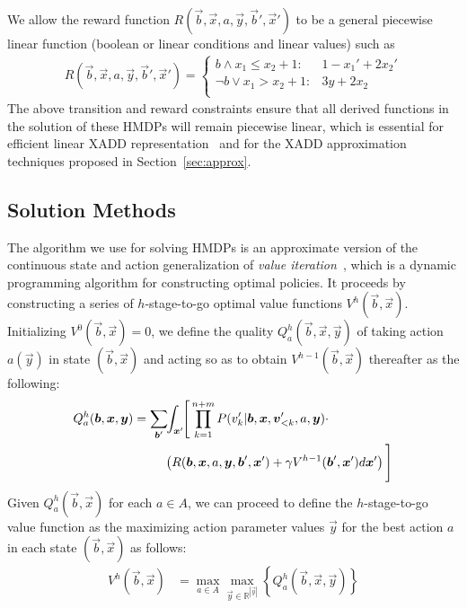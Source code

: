 
We allow the reward function
$R(\vec{b},\vec{x},a,\vec{y},\vec{b}',\vec{x}')$ to be a general
piecewise linear function (boolean or linear conditions and linear
values) such as
\begin{align*}
R(\vec{b},\vec{x},a,\vec{y},\vec{b}',\vec{x}') = \begin{cases}
b \land x_1 \leq x_2 + 1 : & \!\!1 - x_1' + 2x_2' \\
\neg b \lor x_1 > x_2 + 1:     & \!\!3y + 2x_2 \\
\end{cases} %
\end{align*}%
The above transition and reward constraints ensure that all derived
functions in the solution of these HMDPs will remain piecewise
linear, which is essential for efficient linear XADD 
representation~\cite{sanner_uai11} and for the XADD
approximation techniques proposed in Section~\ref{sec:approx}.

\subsection{Solution Methods}

\label{sec:soln}

The algorithm we use for solving HMDPs is an approximate version of
the continuous state and action generalization of {\it value
iteration}~\cite{bellman}, which is a dynamic programming algorithm
for constructing optimal policies.  It proceeds by constructing a
series of $h$-stage-to-go optimal value functions
$V^h(\vec{b},\vec{x})$.  Initializing $V^0(\vec{b},\vec{x}) = 0$, we
define the quality $Q_a^{h}(\vec{b},\vec{x},\vec{y})$ of taking action
$a(\vec{y})$ in state $(\vec{b},\vec{x})$ and acting so as to obtain
$V^{h-1}(\vec{b},\vec{x})$ thereafter as the following:
\vspace{-2.5mm}
{\footnotesize
\begin{align}
Q_a^{h}(\vec{b},\vec{x},\vec{y}) = \sum_{\vec{b}'} & \hspace{-1.0mm} \int_{\vec{x}'} \hspace{-1.0mm} \Bigg[ 
\prod_{k=1}^{n+m} P(v_k'| \vec{b},\vec{x}, \vec{v}'_{<k}, a,\vec{y}) \cdot \label{eq:qfun} \\ 
& \!\! \left( R(\vec{b},\vec{x},a,\vec{y},\vec{b}',\vec{x}') + \gamma V^{h-1}(\vec{b}',\vec{x}') d\vec{x}' \right)  \Bigg] \nonumber
\end{align}}
Given $Q_a^h(\vec{b},\vec{x})$ for each $a \in A$, we can proceed
to define the $h$-stage-to-go value function as the maximizing action parameter
values $\vec{y}$ for the best action $a$ in each state $(\vec{b},\vec{x})$ as follows:
\begin{align}
V^{h}(\vec{b},\vec{x}) & = \max_{a \in A} \max_{\vec{y} \in \mathbb{R}^{|\vec{y}|}} \left\{ Q^{h}_a(\vec{b},\vec{x},\vec{y}) \right\} \label{eq:vfun}
\end{align}

